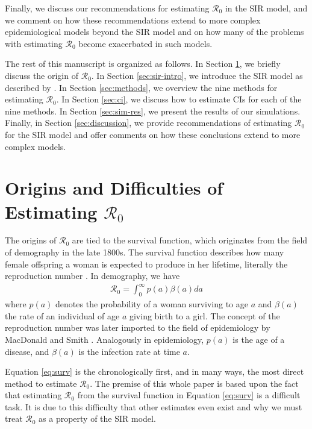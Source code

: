 \documentclass[12pt]{article}
\newcommand{\wxxsir}{nine } %
\newcommand{\rr}{\ensuremath{\mathcal{R}_0}}
\begin{document}
Finally, we discuss our recommendations for estimating $\rr$ in the SIR model, and we comment on how these recommendations extend to more complex epidemiological models beyond the SIR model and on how many of the problems with estimating $\rr$  become exacerbated in such models.


The rest of this manuscript is organized as follows.  In Section \ref{sec:r0}, we briefly discuss the origin of $\rr$.  In Section \ref{sec:sir-intro}, we introduce the SIR model as described by \cite{Kermack700}.  In Section \ref{sec:methods}, we overview the \wxxsir methods for estimating $\rr$. In Section \ref{sec:ci}, we discuss how to estimate CIs for each of the \wxxsir methods.  In Section \ref{sec:sim-res}, we present the results of our simulations.  Finally, in Section \ref{sec:discussion}, we provide recommendations of estimating $\rr$ for the SIR model and offer comments on how these conclusions extend to more complex models.


\section{Origins and Difficulties of Estimating $\rr$}
\label{sec:r0}

The origins of $\rr$ are tied to the survival function, which originates from the field of demography in the late 1800s.  The survival function describes how many female offspring a woman is expected to produce in her lifetime, literally the reproduction number \citep{dietz1993estimation}.  In demography, we have
\begin{align}\label{eq:surv}
\rr = \int_0^\infty p(a) \beta(a) da
\end{align}
where $p(a)$ denotes the probability of a woman surviving to age $a$ and $\beta(a)$ the rate of an individual of age $a$ giving birth to a  girl.  The concept of the reproduction number was later imported to the field of epidemiology by MacDonald and Smith \citep{dietz1993estimation}.  Analogously in epidemiology, $p(a)$ is the age of a disease, and $\beta(a)$ is the infection rate at time $a$.

Equation \ref{eq:surv} is the chronologically first, and in many ways, the most direct method to estimate $\rr$.  The premise of this whole paper is based upon the fact that estimating $\rr$ from the survival function in Equation \eqref{eq:surv} is a difficult task.  It is due to this difficulty that other estimates even exist and why we must treat $\rr$ as a property of the SIR model.
\end{document}
